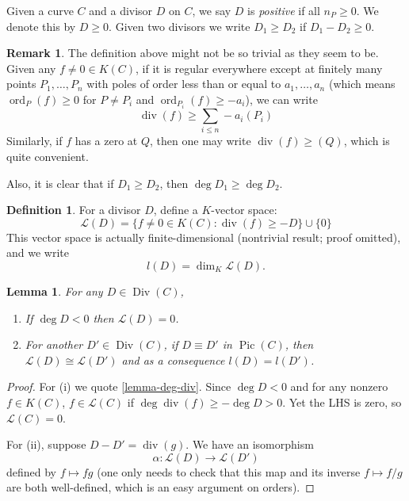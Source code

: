 \documentclass[12pt]{article}
\newtheorem{lemma}{Lemma}[subsection]
\theoremstyle{remark}
\theoremstyle{definition}
\newtheorem{remark}{Remark}[subsection]
\newtheorem{definition}{Definition}[subsection]
\newcommand{\ord}[0]{\operatorname{ord}}
\newcommand{\Div}[0]{\operatorname{Div}}
\newcommand{\pdiv}[0]{\operatorname{div}}
\newcommand{\Pic}[0]{\operatorname{Pic}}
\begin{document}
            Given a curve $C$ and a divisor $D$ on $C$, we say $D$ is \textit{positive} if all $n_P\geqslant 0$. We denote this by $D\geqslant 0$. Given two divisors we write $D_1\geqslant D_2$ if $D_1-D_2\geqslant 0$.
            \begin{remark}\label{remark-L}
                The definition above might not be so trivial as they seem to be. Given any $f\neq 0\in K(C)$, if it is regular everywhere except at finitely many points $P_1,\dots,P_n$ with poles of order less than or equal to $a_1,\dots, a_n$ (which means $\ord_P(f)\geqslant 0$ for $P\neq P_i$ and $\ord_{P_i}(f)\geqslant -a_i$), we can write
                \[\pdiv(f)\geqslant \sum_{i\leqslant n}-a_i(P_i)\]
                Similarly, if $f$ has a zero at $Q$, then one may write $\pdiv(f)\geqslant (Q)$, which is quite convenient.
                
                Also, it is clear that if $D_1\geqslant D_2$, then $\deg D_1\geqslant \deg D_2$.
            \end{remark}
            \begin{definition}
                For a divisor $D$, define a $K$-vector space:
                \[\mathcal L(D)=\{f\neq 0\in K(C):\pdiv(f)\geqslant -D\}\cup\{0\}\]
                This vector space is actually finite-dimensional (nontrivial result; proof omitted), and we write
                \[l(D)=\dim_K\mathcal L(D).\]
            \end{definition}
            \begin{lemma}\label{lemma-neg-deg}
                For any $D\in\Div(C)$,
                \begin{enumerate}[\normalfont(i)]
                    \item If $\deg D<0$ then $\mathcal L(D)=0$.
                    \item For another $D'\in\Div(C)$, if $D\equiv D'$ in $\Pic(C)$, then $\mathcal L(D)\cong\mathcal L(D')$ and as a consequence $l(D)=l(D')$.
                \end{enumerate}
            \end{lemma}
            \begin{proof}
                 For (i) we quote \autoref{lemma-deg-div}. Since $\deg D<0$ and for any nonzero $f\in K(C)$, $f\in\mathcal L(C)$ if $\deg \pdiv(f)\geqslant -\deg D>0$. Yet the LHS is zero, so $\mathcal L(C)=0$.
                 
                 For (ii), suppose $D-D'=\pdiv(g)$. We have an isomorphism
                 \[\alpha:\mathcal L(D)\to\mathcal L(D')\]
                 defined by $f\mapsto fg$ (one only needs to check that this map and its inverse $f\mapsto f/g$ are both well-defined, which is an easy argument on orders).
            \end{proof}
\end{document}
